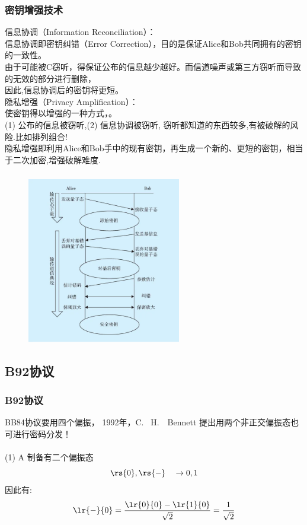 \begin{frame}
  \frametitle{密钥增强技术}
  {\Bullet} 信息协调（Information Reconciliation）：\\
  信息协调即密钥纠错（Error Correction），目的是保证Alice和Bob共同拥有的密钥的一致性。\\
  由于可能被C窃听，得保证公布的信息越少越好。而信道噪声或第三方窃听而导致的无效的部分进行删除，\\
  因此,信息协调后的密钥将更短。\\ \vspace{1em}
  {\Bullet} 隐私增强（Privacy Amplification）：\\
  使密钥得以增强的一种方式，。\\
  (1) 公布的信息被窃听,(2) 信息协调被窃听, 窃听都知道的东西较多,有被破解的风险.比如排列组合!\\
  隐私增强即利用Alice和Bob手中的现有密钥，再生成一个新的、更短的密钥，相当于二次加密,增强破解难度.
\end{frame}

\begin{frame}
  \frametitle{}
\begin{figure}[htbp]
    \centering
    \includegraphics[width=0.6\textwidth]{figs/2022-03-17-00-41-14.png}
\end{figure}
\end{frame}


\subsection{B92协议}
\begin{frame}
  \frametitle{B92协议}
  BB84协议要用四个偏振， 1992年，C.  H.　Bennett 提出用两个非正交偏振态也可进行密码分发！\\ \vspace{0.6em}
  {\color{red}{原理:}} \\ \vspace{1em}
  (1) A 制备有二个偏振态
  \[ \rs{0}, \rs{-} \quad \to 0,1\]
因此有:
\[ \lr{-}{0}=\frac{\lr{0}{0}-\lr{1}{0}}{\sqrt{2}} =\frac{1}{\sqrt{2}} \]
\end{frame}

